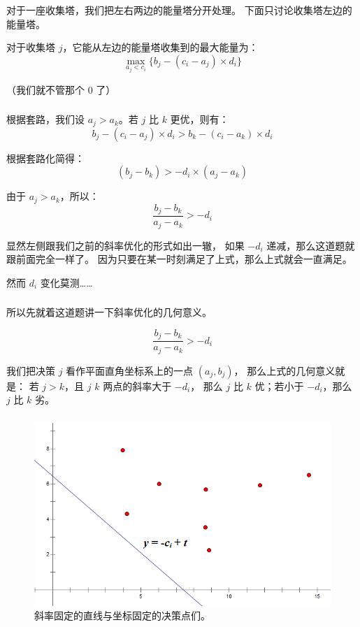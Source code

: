 \documentclass[9pt, UTF8]{beamer} %
\newcommand \fts {\frametitle{\insertsubsection}}
\begin{document}
	\begin{frame}
		\fts

		对于一座收集塔，我们把左右两边的能量塔分开处理。
		下面只讨论收集塔左边的能量塔。

		对于收集塔 $j$，它能从左边的能量塔收集到的最大能量为：
		$$
		\max_{a_j < c_i} \{ b_j - (c_i - a_j) \times d_i \}
		$$

		（我们就不管那个 $0$ 了）
	\end{frame}

	\begin{frame}
		\fts

		根据套路，我们设 $a_j > a_k$。若 $j$ 比 $k$ 更优，则有：
		$$
		b_j - (c_i - a_j) \times d_i > b_k - (c_i - a_k) \times d_i
		$$

		根据套路化简得：
		$$
		(b_j - b_k) > -d_i \times (a_j - a_k)
		$$

		由于 $a_j > a_k$，所以：
		$$
		\frac {b_j - b_k} {a_j - a_k} > -d_i
		$$

		\pause

		显然左侧跟我们之前的斜率优化的形式如出一辙，
		如果 $-d_i$ 递减，那么这道题就跟前面完全一样了。
		因为只要在某一时刻满足了上式，那么上式就会一直满足。

		然而 $d_i$ 变化莫测……
	\end{frame}

	\begin{frame}
		\fts

		所以先就着这道题讲一下斜率优化的几何意义。

		$$
		\frac {b_j - b_k} {a_j - a_k} > -d_i
		$$

		\pause

		我们把决策 $j$ 看作平面直角坐标系上的一点 $(a_j, b_j)$，
		那么上式的几何意义就是：
		若 $j > k$，且 $j$ $k$ 两点的斜率大于 $-d_i$，
		那么 $j$ 比 $k$ 优；若小于 $-d_i$，那么 $j$ 比 $k$ 劣。
	\end{frame}

	\begin{frame}
		\fts

		\begin{figure}
			\centering
			\includegraphics[scale=0.35]{pic/pic5.png}
			\caption{斜率固定的直线与坐标固定的决策点们。}
		\end{figure}
	\end{frame}
\end{document}

